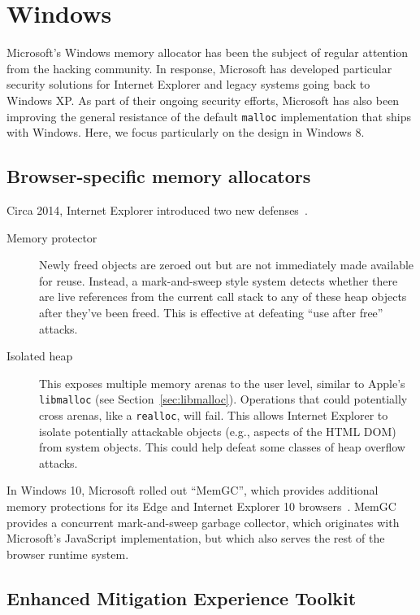 \section{Windows}

Microsoft's Windows memory allocator has been the subject of regular
attention from the hacking community. In response, Microsoft has
developed particular security solutions for Internet Explorer and
legacy systems going back to Windows XP. As part of their ongoing
security efforts, Microsoft has also been improving the general resistance
of the default \texttt{malloc} implementation that ships with Windows.
Here, we focus particularly on the design in Windows 8.

\subsection{Browser-specific memory allocators}

Circa 2014, Internet Explorer introduced two new
defenses~\cite{yason2014,simonz2014}. 
\begin{description}
\item [Memory protector] Newly freed objects are zeroed out but are
  not immediately made available for reuse. Instead, a mark-and-sweep
  style system detects whether there are live references from the
  current call stack to any of these heap objects after they've been
  freed. This is effective at defeating ``use after free'' attacks.
\item [Isolated heap] This exposes multiple memory arenas to the
  user level, similar to Apple's \texttt{libmalloc} (see
  Section~\ref{sec:libmalloc}). Operations that could
  potentially cross arenas, like a \texttt{realloc}, will fail. This
  allows Internet Explorer to isolate potentially attackable objects (e.g., aspects
  of the HTML DOM) from system objects. This could help defeat some
  classes of heap overflow attacks.
\end{description}

In Windows 10, Microsoft rolled out ``MemGC'', which provides additional
memory protections for its Edge and Internet Explorer 10
browsers~\cite{yason2015}. MemGC provides a concurrent mark-and-sweep
garbage collector, which originates with Microsoft's JavaScript
implementation, but which also serves the rest of the browser runtime
system.

\subsection{Enhanced Mitigation Experience Toolkit}

